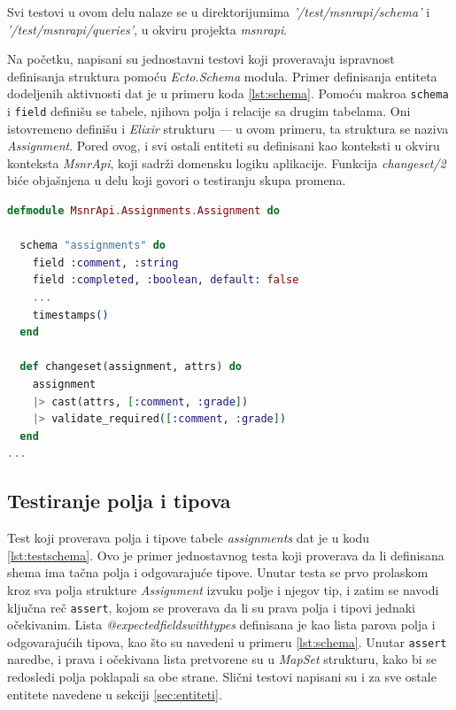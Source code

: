 \documentclass[12pt,oneside]{memoir}
\begin{document}
\par Svi testovi u ovom delu nalaze se u direktorijumima \textit{'/test/msnr{\textunderscore}api/schema'} i \textit{'/test/msnr{\textunderscore}api/queries'}, u okviru projekta \emph{msnr{\textunderscore}api}. 
\par Na početku, napisani su jednostavni testovi koji proveravaju ispravnost definisanja struktura pomoću \emph{Ecto.Schema} modula. Primer definisanja entiteta dodeljenih aktivnosti  dat je u primeru koda \ref{lst:schema}. Pomoću makroa \texttt{schema} i \texttt{field} definišu se tabele, njihova polja i relacije sa drugim tabelama. Oni istovremeno definišu i \emph{Elixir} strukturu --- u ovom primeru, ta struktura se naziva \emph{Assignment}. Pored ovog, i svi ostali entiteti su definisani kao konteksti u okviru konteksta \emph{MsnrApi}, koji sadrži domensku logiku aplikacije. Funkcija \emph{changeset/2} biće objašnjena u delu koji govori o testiranju skupa promena. \\

\begin{minipage}{\linewidth}
\begin{lstlisting}[language=elixir, basicstyle=\small, caption={Shema tabele \emph{assignments}},captionpos=b, label={lst:schema}]
defmodule MsnrApi.Assignments.Assignment do

  schema "assignments" do
    field :comment, :string
    field :completed, :boolean, default: false
    ...
    timestamps()
  end

  def changeset(assignment, attrs) do
    assignment
    |> cast(attrs, [:comment, :grade])
    |> validate_required([:comment, :grade])
  end
...
\end{lstlisting}
\end{minipage}

\subsection{Testiranje polja i tipova}
\par Test koji proverava polja i tipove tabele \emph{assignments} dat je u kodu \ref{lst:testschema}. Ovo je primer jednostavnog testa koji proverava da li definisana shema ima tačna polja i odgovarajuće tipove. Unutar testa se prvo prolaskom kroz sva polja strukture \emph{Assignment} izvuku polje i njegov tip, i zatim se navodi ključna reč \texttt{assert}, kojom se proverava da li su prava polja i tipovi jednaki očekivanim. Lista \emph{@expected{\textunderscore}fields{\textunderscore}with{\textunderscore}types} definisana je kao lista parova polja i odgovarajućih tipova, kao što su navedeni u primeru \ref{lst:schema}. Unutar \texttt{assert} naredbe, i prava i očekivana lista pretvorene su u \emph{MapSet} strukturu, kako bi se redosledi polja poklapali sa obe strane. Slični testovi napisani su i za sve ostale entitete navedene u sekciji \ref{sec:entiteti}. \\
\end{document}
